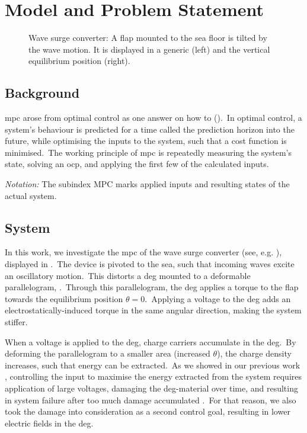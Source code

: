 \section{Model and Problem Statement}

\begin{figure}[htb]
	\centering
	\fontsize{9}{0}\selectfont
	\def\svgwidth{0.5\textwidth}
	
	\caption{Wave surge converter: A flap mounted to the sea floor is tilted by the wave motion. It is displayed in a generic (left) and the vertical equilibrium position (right).}%
\label{fig:flap}
\end{figure}

\subsection{Background}
\ac{mpc} arose from optimal control as one answer on how to  (\cite{rawlings2017mpc}).\ 
In optimal control, a system's behaviour is predicted for a time called the prediction horizon \tf into the future, while optimising the inputs to the system, such that a cost function is minimised.\
The working principle of \ac{mpc} is repeatedly measuring the system's state, solving an \ac{ocp}, and applying the first few of the calculated inputs.\

\textit{Notation:} The subindex $\mathrm{MPC}$ marks applied inputs and resulting states of the actual system.

\subsection{System}
In this work, we investigate the \ac{mpc} of the wave surge converter (see, e.g. \cite{Whittaker2012}), displayed in .\
The device is pivoted to the sea, such that incoming waves excite an oscillatory motion.\ 
This distorts a \ac{deg} mounted to a deformable parallelogram, \cite{Moretti2014}.\ 
Through this parallelogram, the \ac{deg} applies a torque to the flap towards the equilibrium position $\theta=0$.\ 
Applying a voltage to the \ac{deg} adds an electrostatically-induced torque in the same angular direction, making the system stiffer.\ 

When a voltage is applied to the \ac{deg}, charge carriers accumulate in the \ac{deg}.\ 
By deforming the parallelogram to a smaller area (increased $\theta$), the charge density increases, such that energy can be extracted.\  
As we showed in our previous work \cite{Hoffmann2022moocp_wcdeg}, controlling the input to maximise the energy extracted from the system requires application of large voltages, damaging the \ac{deg}-material over time, and resulting in system failure after too much damage accumulated \cite{Chen2019}.\
For that reason, we also took the damage into consideration as a second control goal, resulting in lower electric fields in the \ac{deg}.

